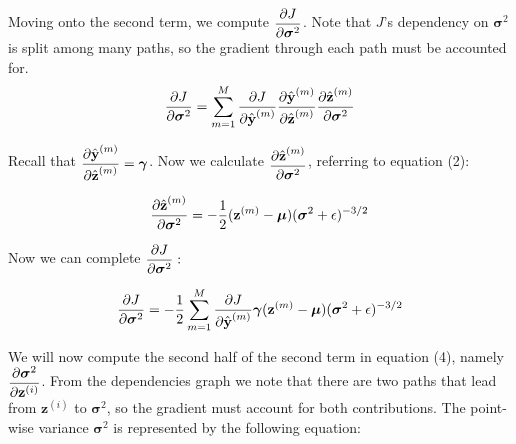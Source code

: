 \documentclass{article}
\begin{document}
\begin{multicols}{2}
Moving onto the second term, we compute $\begin{aligned}
    {\partial J \over \partial \boldsymbol{\sigma}^2}
\end{aligned}$. Note that $J$'s dependency on $\boldsymbol{\sigma}^2$
is split among many paths, so the gradient through each path must be
accounted for.
\begin{equation}
    {\partial J \over \partial \boldsymbol{\sigma}^2} = 
    \sum_{m = 1}^M {\partial J \over \partial \hat{\textbf{y}}^{(m)}} 
    {\partial \hat{\textbf{y}}^{(m)} \over \partial \hat{\textbf{z}}^{(m)}}
    {\partial \hat{\textbf{z}}^{(m)} \over \partial \boldsymbol{\sigma}^2} \notag
\end{equation}

Recall that $\begin{aligned}
    {\partial \hat{\textbf{y}}^{(m)} \over \partial \hat{\textbf{z}}^{(m)}} = \boldsymbol{\gamma}
\end{aligned}$. Now we calculate $\begin{aligned}
    {\partial \hat{\textbf{z}}^{(m)} \over \partial \boldsymbol{\sigma}^2} 
\end{aligned}$, referring to equation (2):

\begin{equation}
    {\partial \hat{\textbf{z}}^{(m)} \over \partial \boldsymbol{\sigma}^2} =
    -{1\over 2} (\textbf{z}^{(m)} - \boldsymbol{\mu}) (\boldsymbol{\sigma}^2 + \epsilon)^{-3/2} \notag
\end{equation}

Now we can complete $\begin{aligned}
    {\partial J \over \partial \boldsymbol{\sigma}^2}:
\end{aligned}$

\begin{equation}
    {\partial J \over \partial \boldsymbol{\sigma}^2} = -{1\over 2}
    \sum_{m = 1}^M {\partial J \over \partial \hat{\textbf{y}}^{(m)}} 
    \boldsymbol{\gamma}
    (\textbf{z}^{(m)} - \boldsymbol{\mu}) (\boldsymbol{\sigma}^2 + \epsilon)^{-3/2}
\end{equation}

We will now compute the second half of the second term in equation (4), 
namely $\begin{aligned}
    {\partial \boldsymbol{\sigma}^2 \over \partial \textbf{z}^{(i)}}
\end{aligned}$. From the dependencies graph we 
note that there are two paths that lead from $\textbf{z}^{(i)}$ to 
$\boldsymbol{\sigma}^2$, so the gradient must account for both contributions.
The point-wise variance $\boldsymbol{\sigma}^2$ is 
represented by the following equation:


\end{multicols}
\end{document}
